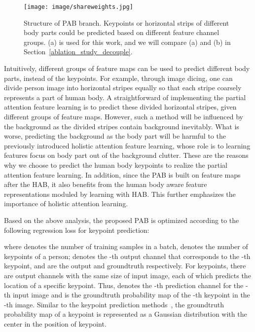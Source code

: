 \documentclass[10pt,twocolumn,letterpaper]{article}
\begin{document}
\begin{figure}[tp]		 \vspace{-3mm}
	\begin{center}
		\begin{minipage}[t]{1.0\linewidth}
\texttt{[image: image/shareweights.jpg]}
		\end{minipage}
	\end{center}
	\vspace{-3mm}
	\caption{Structure of PAB branch. Keypoints or horizontal strips of different body parts could be predicted based on different feature channel groups. (a) is used for this work, and we will compare (a) and (b) in Section~\ref{ablation_study_decouple}.}
	\label{image:shareweights}
\end{figure}

Intuitively, different groups of feature maps can be used to predict different body parts, instead of the keypoints. For example, through image dicing, one can divide person image into horizontal stripes equally so that each stripe coarsely represents a part of human body. A straightforward of implementing the partial attention feature learning is to predict these divided horizontal stripes, given different groups of feature maps. However, such a method will be influenced by the background as the divided stripes contain background inevitably. What is worse, predicting the background as the body part will be harmful to the previously introduced holistic attention feature learning, whose role is to learning features focus on body part out of the background clutter. These are the reasons why we choose to predict the human body keypoints to realize the partial attention feature learning. In addition, since the PAB is built on feature maps after the HAB, it also benefits from the human body aware feature representations moduled by learning with HAB. This further emphasizes the importance of holistic attention learning.

Based on the above analysis, the proposed PAB is optimized according to the following regression loss for keypoint prediction:

where  denotes the number of training samples in a batch,  denotes the number of keypoints of a person;  denotes the -th output channel that corresponds to the -th keypoint,  and  are the output and groundtruth respectively. For  keypoints, there are  output channels with the same size of input image, each of which predicts the location of a specific keypoint. Thus,  denotes the -th prediction channel for the -th input image and  is the groundtruth probability map of the -th keypoint in the -th image. Similar to the keypoint prediction methods~\cite{chen2018cascaded}, the groundtruth probability map of a keypoint is represented as a Gaussian distribution with the center in the position of keypoint.
\end{document}
